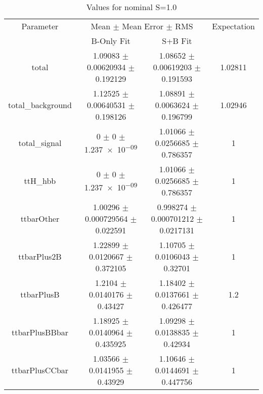 \begin{table}
\centering
\caption{Values for nominal S=1.0}
\begin{tabular}{cccc}
\toprule
Parameter & \multicolumn{2}{c}{Mean $\pm$ Mean Error $\pm$ RMS} & Expectation\\
 & B-Only Fit & S+B Fit & \\
\midrule
total & \num{1.09083} $\pm$ \num{0.00620934} $\pm$ \num{0.192129} & \num{1.08652} $\pm$ \num{0.00619203} $\pm$ \num{0.191593} & \num{1.02811}\\
total\_background & \num{1.12525} $\pm$ \num{0.00640531} $\pm$ \num{0.198126} & \num{1.08891} $\pm$ \num{0.0063624} $\pm$ \num{0.196799} & \num{1.02946}\\
total\_signal & \num{0} $\pm$ \num{0} $\pm$ \num{1.237e-09} & \num{1.01066} $\pm$ \num{0.0256685} $\pm$ \num{0.786357} & \num{1}\\
ttH\_hbb & \num{0} $\pm$ \num{0} $\pm$ \num{1.237e-09} & \num{1.01066} $\pm$ \num{0.0256685} $\pm$ \num{0.786357} & \num{1}\\
ttbarOther & \num{1.00296} $\pm$ \num{0.000729564} $\pm$ \num{0.022591} & \num{0.998274} $\pm$ \num{0.000701212} $\pm$ \num{0.0217131} & \num{1}\\
ttbarPlus2B & \num{1.22899} $\pm$ \num{0.0120667} $\pm$ \num{0.372105} & \num{1.10705} $\pm$ \num{0.0106043} $\pm$ \num{0.32701} & \num{1}\\
ttbarPlusB & \num{1.2104} $\pm$ \num{0.0140176} $\pm$ \num{0.43427} & \num{1.18402} $\pm$ \num{0.0137661} $\pm$ \num{0.426477} & \num{1.2}\\
ttbarPlusBBbar & \num{1.18925} $\pm$ \num{0.0140964} $\pm$ \num{0.435925} & \num{1.09298} $\pm$ \num{0.0138835} $\pm$ \num{0.42934} & \num{1}\\
ttbarPlusCCbar & \num{1.03566} $\pm$ \num{0.0141955} $\pm$ \num{0.43929} & \num{1.10646} $\pm$ \num{0.0144691} $\pm$ \num{0.447756} & \num{1}\\
\bottomrule
\end{tabular}
\end{table}